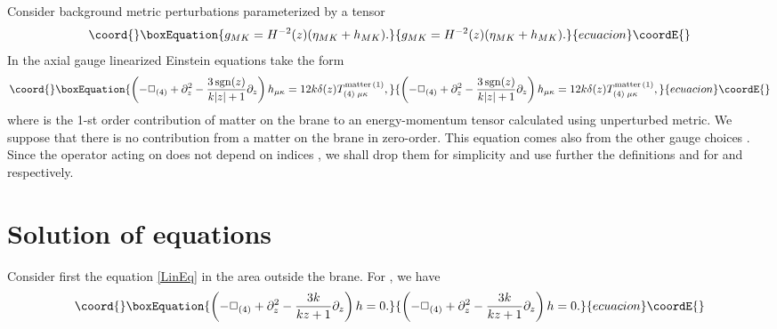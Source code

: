 \documentclass[letterpaper,12pt]{article}
\providecommand*{\sgn}{\mathop{\rm sgn}\nolimits}
\begin{document}
Consider  background metric perturbations parameterized by a
tensor \coordHE{}
\begin{equation}\coord{}\boxEquation{
\label{PrtbMetric}g_{MK}=H^{-2}(z)(\eta_{MK}+h_{MK}).
}{
g_{MK}=H^{-2}(z)(\eta_{MK}+h_{MK}).
}{ecuacion}\coordE{}\end{equation}
In the axial gauge
\cite{Randall99a,Randall99b,Garriga99,Giddings00}\coordHE{} linearized Einstein
equations take the form
\begin{equation}\coord{}\boxEquation{
\label{LinEq} \left(-{\Box}_{(4)} + \partial_z^2 - \frac{3\sgn(z)
}{k|z|+1}\partial_z\right)h_{\mu\kappa} =
12k\delta(z)T_{(4)\;\mu\kappa}^{\text{matter}\,(1)},
}{
\left(-{\Box}_{(4)} + \partial_z^2 - \frac{3\sgn(z)
}{k|z|+1}\partial_z\right)h_{\mu\kappa} =
12k\delta(z)T_{(4)\;\mu\kappa}^{\text{matter}\,(1)},
}{ecuacion}\coordE{}\end{equation}
where \coordHE{} is the 1-st order
contribution of matter on the brane to an energy-momentum tensor
calculated using unperturbed metric. We suppose that there is no
contribution  from a matter on the brane  in zero-order. This
equation comes also from the other gauge choices \cite{Aref'eva}.
Since the operator acting on \coordHE{} does not depend on
indices \myHighlight{$\mu,\kappa$}\coordHE{}, we shall drop them for simplicity and use
further the definitions \coordHE{} and \coordHE{} for \coordHE{} and
\coordHE{} respectively.

\section{Solution of equations}\label{solution}
Consider first the equation \eqref{LinEq} in the area outside the
brane.  For \coordHE{}, we have
 \begin{equation}\coord{}\boxEquation{
\label{void}
  \left(-\Box_{(4)} + \partial_z^2 -
 \frac{3k}{kz+1}\partial_z\right)h = 0.
}{
\left(-\Box_{(4)} + \partial_z^2 -
 \frac{3k}{kz+1}\partial_z\right)h = 0.
}{ecuacion}\coordE{}\end{equation}
\end{document}
